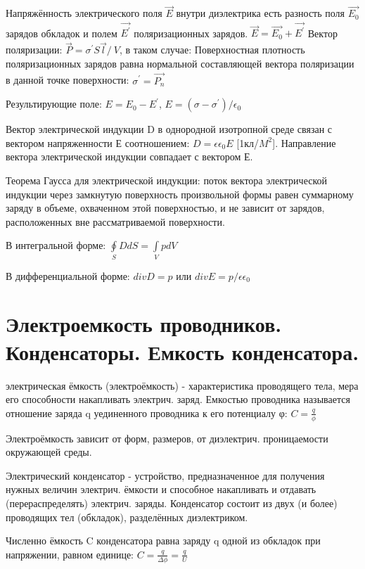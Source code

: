 \documentclass[12pt]{report}
\begin{document}
Напряжённость электрического поля $\stackrel{\xrightarrow{}}{E}$ внутри диэлектрика есть разность поля $\stackrel{\xrightarrow{}}{E_0}$ зарядов обкладок и полем $\stackrel{\xrightarrow{}}{E^\prime}$ поляризационных зарядов.
$\stackrel{\xrightarrow{}}{E} = \stackrel{\xrightarrow{}}{E_0} + \stackrel{\xrightarrow{}}{E^\prime}$
Вектор поляризации: $\stackrel{\xrightarrow{}}{P} = \sigma^\prime S \stackrel{\xrightarrow{}}{l} /\ V$, в таком случае: Поверхностная плотность поляризационных зарядов равна нормальной составляющей вектора поляризации в данной точке поверхности: $\sigma^\prime = \stackrel{\xrightarrow{}}{P_n}$

Результирующие поле: $E = E_0 - E^\prime$, $E = (\sigma - \sigma^\prime) / \epsilon_0$

Вектор электрической индукции D в однородной изотропной среде связан с вектором напряженности Е соотношением: $D = \epsilon \epsilon_0 E $ [1кл/$M^2$]. Направление вектора электрической индукции совпадает с вектором Е.

Теорема Гаусса для электрической индукции: поток вектора электрической индукции через замкнутую поверхность произвольной формы равен суммарному заряду в объеме, охваченном этой поверхностью, и не зависит от зарядов, расположенных вне рассматриваемой поверхности.

В интегральной форме: $\oint\limits_{S}DdS = \int\limits_{V}pdV$

В дифференциальной форме: $div D = p$ или $div E = p / \epsilon \epsilon_0$

\section{Электроемкость проводников. Конденсаторы. Емкость конденсатора.}
электрическая ёмкость (электроёмкость) - характеристика проводящего тела, мера его способности накапливать электрич. заряд.
Емкостью проводника называется отношение заряда q уединенного проводника к его потенциалу φ:
$C = \frac{q}{\phi}$

Электроёмкость зависит от форм, размеров, от диэлектрич. проницаемости окружающей среды.

Электрический конденсатор - устройство, предназначенное для получения нужных величин электрич. ёмкости и способное накапливать и отдавать (перераспределять) электрич. заряды. Конденсатор состоит из двух (и более) проводящих тел (обкладок), разделённых диэлектриком.

Численно ёмкость C конденсатора равна заряду q одной из обкладок при напряжении, равном единице:
$C = \frac{q}{\Delta \phi} = \frac{q}{U}$
\end{document}
